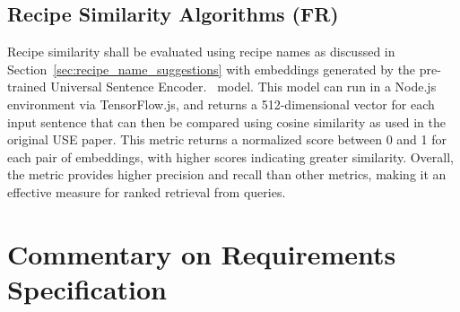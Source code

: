 \subsection{Recipe Similarity Algorithms (FR)}\label{sec:recipe_similarity}

Recipe similarity shall be evaluated using recipe names as discussed in Section~\ref{sec:recipe_name_suggestions}
with embeddings generated by the pre-trained Universal Sentence Encoder.~\cite{cer_universal_2018} model.
This model can run in a Node.js environment via TensorFlow.js, and returns a 512-dimensional vector
for each input sentence that can then be compared using cosine similarity as used in the original
USE paper. This metric returns a normalized score between 0 and 1 for each pair of embeddings, with
higher scores indicating greater similarity. Overall, the metric provides higher precision and recall
than other metrics, making it an effective measure for ranked retrieval from queries.~\cite{ihajeer_comparison_2012}

\section{Commentary on Requirements Specification}
